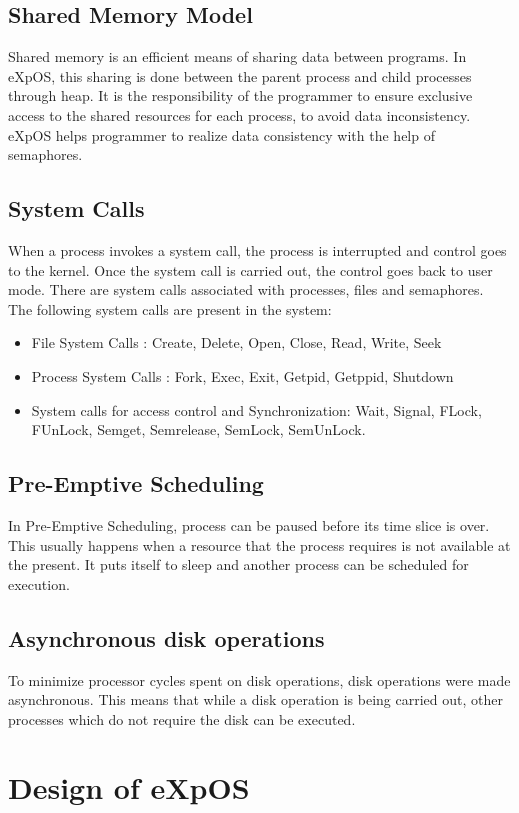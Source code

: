 \documentclass[10pt]{article}
\begin{document}
\subsection{Shared Memory Model}
Shared memory is an efficient means of sharing data between programs. In eXpOS, this sharing is done between the parent process and child processes through heap. It is the responsibility of the programmer to ensure exclusive access to the shared resources for each process, to avoid data inconsistency. eXpOS helps programmer to realize data consistency with the help of semaphores. 
\subsection{System Calls}
When a process invokes a system call, the process is interrupted and control goes to the kernel. Once the system call is carried out, the control goes back to user mode. There are system calls associated with processes, files and semaphores.\\
The following system calls are present in the system: 
\begin{itemize}
\item File System Calls : Create, Delete, Open, Close, Read, Write, Seek
\item Process System Calls : Fork, Exec, Exit, Getpid, Getppid, Shutdown
\item System calls for access control and Synchronization: Wait, Signal, FLock, FUnLock, Semget, Semrelease, SemLock, SemUnLock.
\end{itemize}

\subsection{Pre-Emptive Scheduling}
In Pre-Emptive Scheduling, process can be paused before its time slice is over. This usually happens when a resource that the process requires is not available at the present. It puts itself to sleep and another process can be scheduled for execution.
\subsection{Asynchronous disk operations}
To minimize processor cycles spent on disk operations, disk operations were made asynchronous. This means that while a disk operation is being carried out, other processes which do not require the disk can be executed.
\section{Design of eXpOS}
\end{document}
